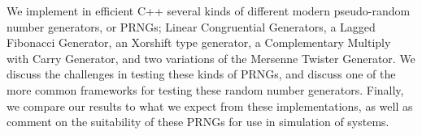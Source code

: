 We implement in efficient C++ several kinds of different modern pseudo-random number generators, or PRNGs; Linear Congruential Generators, a Lagged Fibonacci Generator, an Xorshift type generator, a Complementary Multiply with Carry Generator, and two variations of the Mersenne Twister Generator. We discuss the challenges in testing these kinds of PRNGs, and discuss one of the more common frameworks for testing these random number generators. Finally, we compare our results to what we expect from these implementations, as well as comment on the suitability of these PRNGs for use in simulation of systems.
